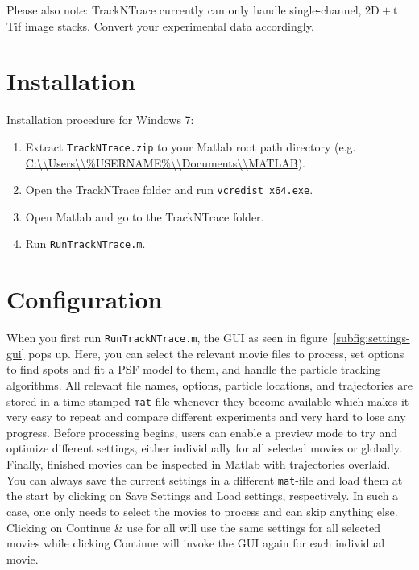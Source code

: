 \documentclass[11pt,onside]{report}
\numberwithin{equation}{chapter}
\begin{document}
Please also note: TrackNTrace currently can only handle single-channel, $\mathrm{2D}+\mathrm{t}$ Tif image stacks. Convert your experimental data accordingly. \clearpage%

\section{Installation}\label{sec:install}
Installation procedure for Windows 7:
\begin{enumerate}
\item Extract \texttt{TrackNTrace.zip} to your Matlab root path directory (e.g. \url{C:\\Users\\\%USERNAME\%\\Documents\\MATLAB}).
\item Open the TrackNTrace folder and run \texttt{vcredist\_x64.exe}.
\item Open Matlab and go to the TrackNTrace folder.
\item Run \texttt{RunTrackNTrace.m}.
\end{enumerate}

\section{Configuration}\label{sec:config}
When you first run \texttt{RunTrackNTrace.m}, the GUI as seen in figure~\ref{subfig:settings-gui} pops up. Here, you can select the relevant movie files to process, set options to find spots and fit a PSF model to them, and handle the particle tracking algorithms. All relevant file names, options, particle locations, and trajectories are stored in a time-stamped \texttt{mat}-file whenever they become available which makes it very easy to repeat and compare different experiments and very hard to lose any progress. Before processing begins, users can enable a preview mode to try and optimize different settings, either individually for all selected movies or globally. Finally, finished movies can be inspected in Matlab with trajectories overlaid.\\
You can always save the current settings in a different \texttt{mat}-file and load them at the start by clicking on \textsf{Save Settings} and \textsf{Load settings}, respectively. In such a case, one only needs to select the movies to process and can skip anything else. Clicking on \textsf{Continue \& use for all} will use the same settings for all selected movies while clicking \textsf{Continue} will invoke the GUI again for each individual movie.
\end{document}
